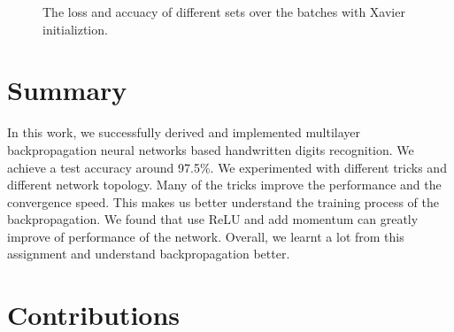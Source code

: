 \documentclass{article} %
\begin{document}
\begin{figure} [!htbp]
	
	\caption{The loss and accuacy of different sets over the batches with Xavier initializtion. }  
	\label{Figure: Xav}
	
\end{figure}

\section{Summary}
In this work, we successfully derived and implemented multilayer backpropagation neural networks based handwritten digits recognition. We achieve a test accuracy around 97.5\%. We experimented with different tricks and different network topology. Many of the tricks improve the performance and the convergence speed. This makes us better understand the training process of the backpropagation. We found that use ReLU and add momentum can greatly improve of performance of the network. Overall, we learnt a lot from this assignment and understand backpropagation better. 

\section{Contributions}
\end{document}
